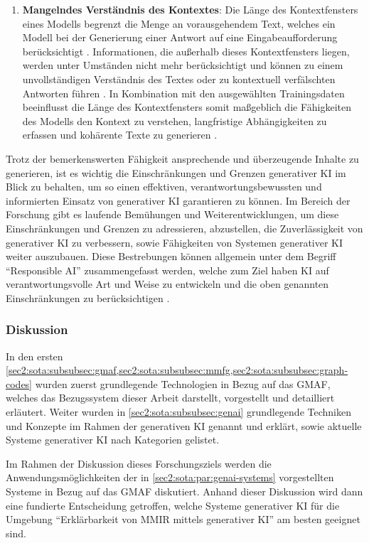 \begin{enumerate}
    \item \textbf{Mangelndes Verständnis des Kontextes}:
    Die Länge des Kontextfensters eines Modells begrenzt die Menge an vorausgehendem Text, welches ein Modell bei der Generierung einer Antwort auf eine Eingabeaufforderung berücksichtigt \cite{v7labs-llm-limitations}.
    Informationen, die außerhalb dieses Kontextfensters liegen, werden unter Umständen nicht mehr berücksichtigt und können zu einem unvollständigen Verständnis des Textes oder zu kontextuell verfälschten Antworten führen \cite{v7labs-llm-limitations}.
    In Kombination mit den ausgewählten Trainingsdaten beeinflusst die Länge des Kontextfensters somit maßgeblich die Fähigkeiten des Modells den Kontext zu verstehen, langfristige Abhängigkeiten zu erfassen und kohärente Texte zu generieren \cite{v7labs-llm-limitations}.
\end{enumerate}

Trotz der bemerkenswerten Fähigkeit ansprechende und überzeugende Inhalte zu generieren, ist es wichtig die Einschränkungen und Grenzen generativer KI im Blick zu behalten, um so einen effektiven, verantwortungsbewussten und informierten Einsatz von generativer KI garantieren zu können.
Im Bereich der Forschung gibt es laufende Bemühungen und Weiterentwicklungen, um diese Einschränkungen und Grenzen zu adressieren, abzustellen, die Zuverlässigkeit von generativer KI zu verbessern, sowie Fähigkeiten von Systemen generativer KI weiter auszubauen.
Diese Bestrebungen können allgemein unter dem Begriff \enquote{Responsible AI} zusammengefasst werden, welche zum Ziel haben KI auf verantwortungsvolle Art und Weise zu entwickeln und die oben genannten Einschränkungen zu berücksichtigen \cite{gabler-responsible-ai}.

\subsubsection{Diskussion}
\label{sec2:sota:subsubsec:fz1:discussion}
In den ersten {\cref{sec2:sota:subsubsec:gmaf,sec2:sota:subsubsec:mmfg,sec2:sota:subsubsec:graph-codes}} wurden zuerst grundlegende Technologien in Bezug auf das GMAF, welches das Bezugssystem dieser Arbeit darstellt, vorgestellt und detailliert erläutert.
Weiter wurden in \cref{sec2:sota:subsubsec:genai} grundlegende Techniken und Konzepte im Rahmen der generativen KI genannt und erklärt, sowie aktuelle Systeme generativer KI nach Kategorien gelistet.

Im Rahmen der Diskussion dieses Forschungsziels werden die Anwendungsmöglichkeiten der in \cref{sec2:sota:par:genai-systems} vorgestellten Systeme in Bezug auf das GMAF diskutiert.
Anhand dieser Diskussion wird dann eine fundierte Entscheidung getroffen, welche Systeme generativer KI für die Umgebung \enquote{Erklärbarkeit von MMIR mittels generativer KI} am besten geeignet sind.

